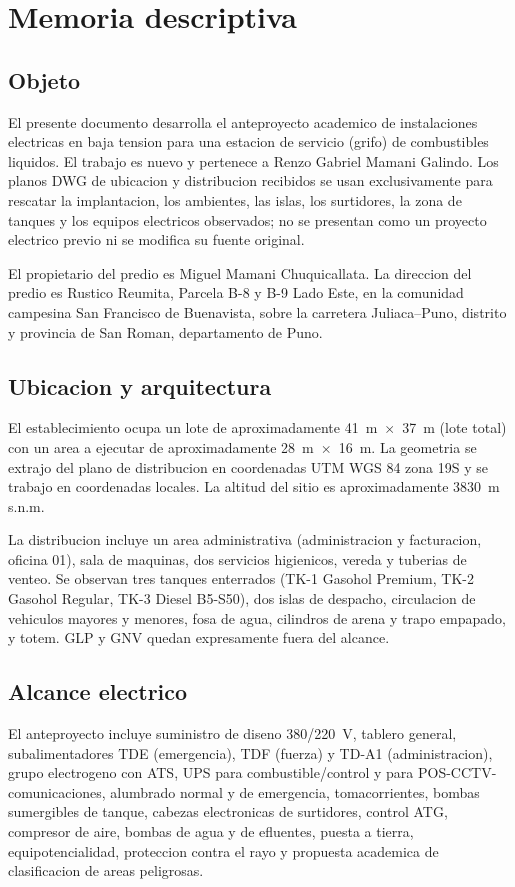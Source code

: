 \chapter{Memoria descriptiva}

\section{Objeto}
El presente documento desarrolla el anteproyecto academico de instalaciones
electricas en baja tension para una estacion de servicio (grifo) de
combustibles liquidos. El trabajo es nuevo y pertenece a Renzo Gabriel Mamani
Galindo. Los planos DWG de ubicacion y distribucion recibidos se usan
exclusivamente para rescatar la implantacion, los ambientes, las islas, los
surtidores, la zona de tanques y los equipos electricos observados; no se
presentan como un proyecto electrico previo ni se modifica su fuente original.

El propietario del predio es Miguel Mamani Chuquicallata. La direccion del
predio es Rustico Reumita, Parcela B-8 y B-9 Lado Este, en la comunidad
campesina San Francisco de Buenavista, sobre la carretera Juliaca--Puno,
distrito y provincia de San Roman, departamento de Puno.

\section{Ubicacion y arquitectura}
El establecimiento ocupa un lote de aproximadamente 41~m~\(\times\)~37~m (lote
total) con un area a ejecutar de aproximadamente 28~m~\(\times\)~16~m. La
geometria se extrajo del plano de distribucion en coordenadas UTM WGS 84 zona
19S y se trabajo en coordenadas locales. La altitud del sitio es
aproximadamente 3830~m s.n.m.

La distribucion incluye un area administrativa (administracion y facturacion,
oficina 01), sala de maquinas, dos servicios higienicos, vereda y tuberias de
venteo. Se observan tres tanques enterrados (TK-1 Gasohol Premium, TK-2
Gasohol Regular, TK-3 Diesel B5-S50), dos islas de despacho, circulacion de
vehiculos mayores y menores, fosa de agua, cilindros de arena y trapo
empapado, y totem. GLP y GNV quedan expresamente fuera del alcance.

\section{Alcance electrico}
El anteproyecto incluye suministro de diseno 380/220~V, tablero general,
subalimentadores TDE (emergencia), TDF (fuerza) y TD-A1 (administracion),
grupo electrogeno con ATS, UPS para combustible/control y para
POS-CCTV-comunicaciones, alumbrado normal y de emergencia, tomacorrientes,
bombas sumergibles de tanque, cabezas electronicas de surtidores, control
ATG, compresor de aire, bombas de agua y de efluentes, puesta a tierra,
equipotencialidad, proteccion contra el rayo y propuesta academica de
clasificacion de areas peligrosas.

